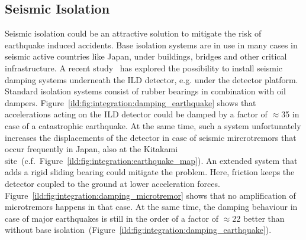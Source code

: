 \subsection{Seismic Isolation}

Seismic isolation could be an attractive solution to mitigate the risk of earthquake induced accidents. Base isolation systems are in use in many cases in seismic active countries like Japan, under buildings, bridges and other critical infrastructure. A recent study~\cite{ild:bib:Seismic_Damping} has explored the possibility to install seismic damping systems underneath the ILD detector, e.g. under the detector platform. Standard isolation systems consist of rubber bearings in combination with oil dampers. Figure~\ref{ild:fig:integration:damping_earthquake} shows that accelerations acting on the ILD detector could be damped by a factor of $\approx$35 in case of a catastrophic earthquake. At the same time, such a system unfortunately increases the displacements of the detector in case of seismic mircrotremors that occur frequently in Japan, also at the Kitakami site~(c.f.~Figure~\ref{ild:fig:integration:earthquake_map}). An extended system that adds a rigid sliding bearing could mitigate the problem. Here, friction keeps the detector coupled to the ground at lower acceleration forces. Figure~\ref{ild:fig:integration:damping_microtremor} shows that no amplification of microtremors happens in that case. At the same time, the damping behaviour in case of major earthquakes is still in the order of a factor of $\approx$22 better than without base isolation~(Figure~\ref{ild:fig:integration:damping_earthquake}). 

